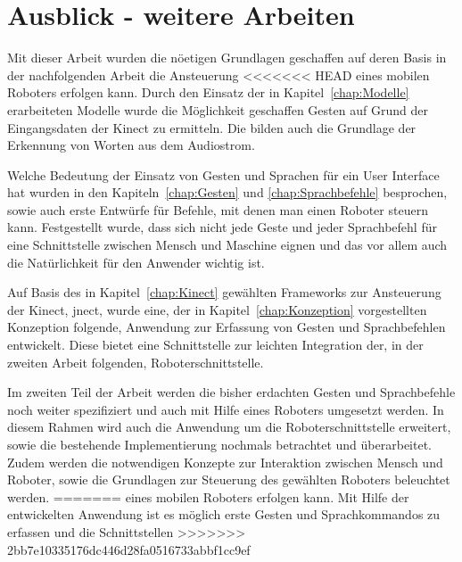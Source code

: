 \chapter{Ausblick - weitere Arbeiten}
\label{chap:Ausblick}

Mit dieser Arbeit wurden die n\"oetigen Grundlagen geschaffen auf deren Basis in der nachfolgenden Arbeit die Ansteuerung 
<<<<<<< HEAD
eines mobilen Roboters erfolgen kann. Durch den Einsatz der in Kapitel~\ref{chap:Modelle} erarbeiteten Modelle wurde die 
M\"oglichkeit geschaffen Gesten auf Grund der Eingangsdaten der Kinect zu ermitteln. Die 
bilden auch die Grundlage der Erkennung von Worten aus dem Audiostrom. 

Welche Bedeutung der Einsatz von Gesten und Sprachen f\"ur ein User Interface hat wurden in den Kapiteln~\ref{chap:Gesten} und 
\ref{chap:Sprachbefehle} besprochen, sowie auch erste Entw\"urfe f\"ur Befehle, mit denen man einen Roboter steuern kann.
Festgestellt wurde, dass sich nicht jede Geste und jeder Sprachbefehl f\"ur eine Schnittstelle zwischen Mensch und Maschine eignen
und das vor allem auch die Nat\"urlichkeit f\"ur den Anwender wichtig ist.

Auf Basis des in Kapitel~\ref{chap:Kinect} gew\"ahlten Frameworks zur Ansteuerung der Kinect, jnect, wurde eine, der in 
Kapitel~\ref{chap:Konzeption} vorgestellten Konzeption folgende, Anwendung zur Erfassung von Gesten und Sprachbefehlen entwickelt. 
Diese bietet eine Schnittstelle zur leichten Integration der, in der zweiten Arbeit folgenden, Roboterschnittstelle.

Im zweiten Teil der Arbeit werden die bisher erdachten Gesten und Sprachbefehle noch weiter spezifiziert und auch mit Hilfe
eines Roboters umgesetzt werden. In diesem Rahmen wird auch die Anwendung um die Roboterschnittstelle erweitert, sowie die
bestehende Implementierung nochmals betrachtet und überarbeitet. Zudem werden die notwendigen Konzepte zur Interaktion 
zwischen Mensch und Roboter, sowie die Grundlagen zur Steuerung des gew\"ahlten Roboters beleuchtet werden. %
=======
eines mobilen Roboters erfolgen kann. Mit Hilfe der entwickelten Anwendung ist es m\"oglich erste Gesten und Sprachkommandos zu erfassen und die Schnittstellen
>>>>>>> 2bb7e10335176dc446d28fa0516733abbf1cc9ef
